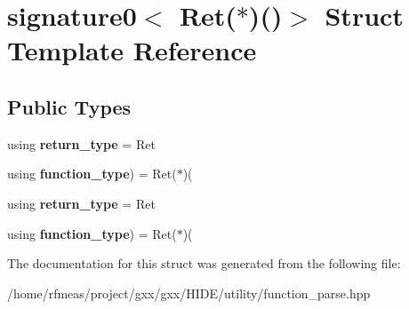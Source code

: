 \hypertarget{structsignature0_3_01Ret_07_5_08_07_08_4}{}\section{signature0$<$ Ret($\ast$)()$>$ Struct Template Reference}
\label{structsignature0_3_01Ret_07_5_08_07_08_4}
\subsection*{Public Types}
\begin{DoxyCompactItemize}
\item 
using {\bfseries return\+\_\+type} = Ret\hypertarget{structsignature0_3_01Ret_07_5_08_07_08_4_a04adb229178232ea1a5fc01adb99302e}{}\label{structsignature0_3_01Ret_07_5_08_07_08_4_a04adb229178232ea1a5fc01adb99302e}

\item 
using {\bfseries function\+\_\+type}) = Ret($\ast$)(\hypertarget{structsignature0_3_01Ret_07_5_08_07_08_4_af9899050f4602e14f5b40b3267a0e167}{}\label{structsignature0_3_01Ret_07_5_08_07_08_4_af9899050f4602e14f5b40b3267a0e167}

\item 
using {\bfseries return\+\_\+type} = Ret\hypertarget{structsignature0_3_01Ret_07_5_08_07_08_4_a04adb229178232ea1a5fc01adb99302e}{}\label{structsignature0_3_01Ret_07_5_08_07_08_4_a04adb229178232ea1a5fc01adb99302e}

\item 
using {\bfseries function\+\_\+type}) = Ret($\ast$)(\hypertarget{structsignature0_3_01Ret_07_5_08_07_08_4_af9899050f4602e14f5b40b3267a0e167}{}\label{structsignature0_3_01Ret_07_5_08_07_08_4_af9899050f4602e14f5b40b3267a0e167}

\end{DoxyCompactItemize}


The documentation for this struct was generated from the following file\+:\begin{DoxyCompactItemize}
\item 
/home/rfmeas/project/gxx/gxx/\+H\+I\+D\+E/utility/function\+\_\+parse.\+hpp\end{DoxyCompactItemize}
